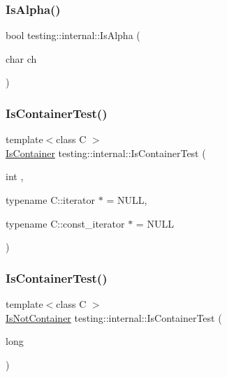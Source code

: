 \mbox{\label{namespacetesting_1_1internal_aeb957087fd6bbf9db98ab7cd41b0c129}} 
\subsubsection{\texorpdfstring{IsAlpha()}{IsAlpha()}}
{\footnotesize\ttfamily bool testing\+::internal\+::\+Is\+Alpha (\begin{DoxyParamCaption}\item[{char}]{ch }\end{DoxyParamCaption})\hspace{0.3cm}{\ttfamily [inline]}}

\mbox{\label{namespacetesting_1_1internal_acb6ea1086293c1d6636e3c67941351fb}} 
\subsubsection{\texorpdfstring{IsContainerTest()}{IsContainerTest()}\hspace{0.1cm}{\footnotesize\ttfamily [1/2]}}
{\footnotesize\ttfamily template$<$class C $>$ \\
\mbox{\hyperlink{namespacetesting_1_1internal_ad8f0c2883245f1df2a53618a49f0deb3}{Is\+Container}} testing\+::internal\+::\+Is\+Container\+Test (\begin{DoxyParamCaption}\item[{int}]{,  }\item[{typename C\+::iterator $\ast$}]{ = {\ttfamily NULL},  }\item[{typename C\+::const\+\_\+iterator $\ast$}]{ = {\ttfamily NULL} }\end{DoxyParamCaption})}

\mbox{\label{namespacetesting_1_1internal_af545a2ae928b8a9e7581978234464275}} 
\subsubsection{\texorpdfstring{IsContainerTest()}{IsContainerTest()}\hspace{0.1cm}{\footnotesize\ttfamily [2/2]}}
{\footnotesize\ttfamily template$<$class C $>$ \\
\mbox{\hyperlink{namespacetesting_1_1internal_abf080521ce135deb510e0a7830fd3d33}{Is\+Not\+Container}} testing\+::internal\+::\+Is\+Container\+Test (\begin{DoxyParamCaption}\item[{long}]{ }\end{DoxyParamCaption})}

